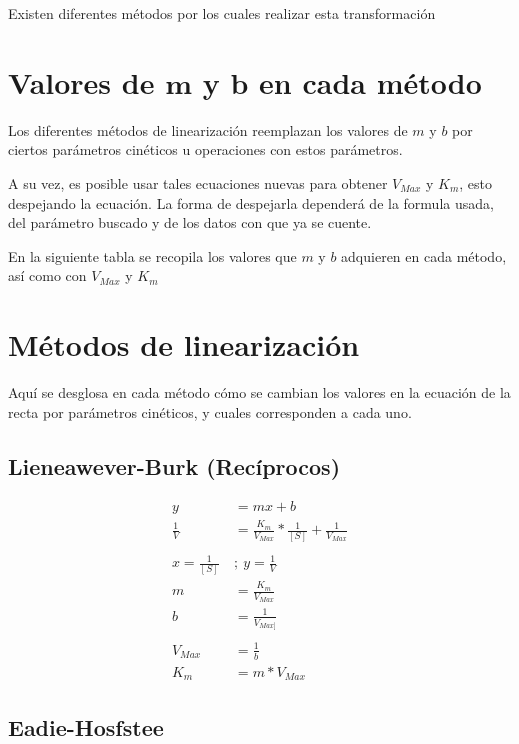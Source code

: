 Existen diferentes métodos por los cuales realizar esta transformación

\section{Valores de $\mathbf{m}$ y $\mathbf{b}$ en cada método}

Los diferentes métodos de linearización reemplazan los valores de $m$ y $b$ por ciertos parámetros cinéticos u operaciones con estos parámetros.

A su vez, es posible usar tales ecuaciones nuevas para obtener $V_{Max}$ y $K_{m}$, esto despejando la ecuación. La forma de despejarla dependerá de la formula usada, del parámetro buscado y de los datos con que ya se cuente.

En la siguiente tabla se recopila los valores que $m$ y $b$ adquieren en cada método, así como con $V_{Max}$ y $K_{m}$

    

\section{Métodos de linearización}

Aquí se desglosa en cada método cómo se cambian los valores en la ecuación de la recta por parámetros cinéticos, y cuales corresponden a cada uno.

\subsection{Lieneawever-Burk (Recíprocos)}

\begin{align*}
    y &= mx+b
    \\
    \frac{1}{V} &= \frac{K_{m}}{V_{Max}} * \frac{1}{[S]} + \frac{1}{V_{Max}}
    \\
    \\
    x = \frac{1}{[S]} \ &; \ y = \frac{1}{V}
    \\
    m &= \frac{K_{m}}{V_{Max}}
    \\
    b &= \frac{1}{V_{Max]}}
    \\
    \\
    V_{Max} &= \frac{1}{b}
    \\
    K_{m} &= m * V_{Max}
\end{align*}

\subsection{Eadie-Hosfstee}

